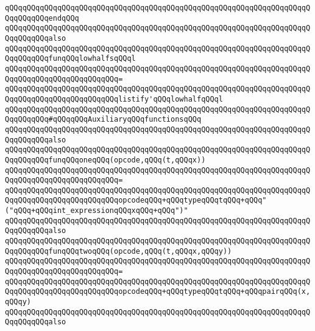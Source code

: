 \verb|qQQqqQQqqQQqqQQqqQQqqQQqqQQqqQQqqQQqqQQqqQQqqQQqqQQqqQQqqQQqqQQqqQQqqQQqqQQqqQQqendqQQq|\newline
\newline
\verb|qQQqqQQqqQQqqQQqqQQqqQQqqQQqqQQqqQQqqQQqqQQqqQQqqQQqqQQqqQQqqQQqqQQqqQQqqQQqqQQqalso|\newline
\verb|qQQqqQQqqQQqqQQqqQQqqQQqqQQqqQQqqQQqqQQqqQQqqQQqqQQqqQQqqQQqqQQqqQQqqQQqqQQqqQQqfunqQQqlowhalfsqQQql|\newline
\verb|qQQqqQQqqQQqqQQqqQQqqQQqqQQqqQQqqQQqqQQqqQQqqQQqqQQqqQQqqQQqqQQqqQQqqQQqqQQqqQQqqQQqqQQqqQQqqQQq=|\newline
\verb|qQQqqQQqqQQqqQQqqQQqqQQqqQQqqQQqqQQqqQQqqQQqqQQqqQQqqQQqqQQqqQQqqQQqqQQqqQQqqQQqqQQqqQQqqQQqqQQqlistify'qQQqlowhalfqQQql|\newline
\newline
\newline
\verb|qQQqqQQqqQQqqQQqqQQqqQQqqQQqqQQqqQQqqQQqqQQqqQQqqQQqqQQqqQQqqQQqqQQqqQQqqQQqqQQq#qQQqqQQqAuxiliaryqQQqfunctionsqQQq|\newline
\verb|qQQqqQQqqQQqqQQqqQQqqQQqqQQqqQQqqQQqqQQqqQQqqQQqqQQqqQQqqQQqqQQqqQQqqQQqqQQqqQQqalso|\newline
\verb|qQQqqQQqqQQqqQQqqQQqqQQqqQQqqQQqqQQqqQQqqQQqqQQqqQQqqQQqqQQqqQQqqQQqqQQqqQQqqQQqfunqQQqoneqQQq(opcode,qQQq(t,qQQqx))|\newline
\verb|qQQqqQQqqQQqqQQqqQQqqQQqqQQqqQQqqQQqqQQqqQQqqQQqqQQqqQQqqQQqqQQqqQQqqQQqqQQqqQQqqQQqqQQqqQQqqQQq=|\newline
\verb|qQQqqQQqqQQqqQQqqQQqqQQqqQQqqQQqqQQqqQQqqQQqqQQqqQQqqQQqqQQqqQQqqQQqqQQqqQQqqQQqqQQqqQQqqQQqqQQqopcodeqQQq+qQQqtypeqQQqtqQQq+qQQq"("qQQq+qQQqint_expressionqQQqxqQQq+qQQq")"|\newline
\newline
\verb|qQQqqQQqqQQqqQQqqQQqqQQqqQQqqQQqqQQqqQQqqQQqqQQqqQQqqQQqqQQqqQQqqQQqqQQqqQQqqQQqalso|\newline
\verb|qQQqqQQqqQQqqQQqqQQqqQQqqQQqqQQqqQQqqQQqqQQqqQQqqQQqqQQqqQQqqQQqqQQqqQQqqQQqqQQqfunqQQqtwoqQQq(opcode,qQQq(t,qQQqx,qQQqy))|\newline
\verb|qQQqqQQqqQQqqQQqqQQqqQQqqQQqqQQqqQQqqQQqqQQqqQQqqQQqqQQqqQQqqQQqqQQqqQQqqQQqqQQqqQQqqQQqqQQqqQQq=|\newline
\verb|qQQqqQQqqQQqqQQqqQQqqQQqqQQqqQQqqQQqqQQqqQQqqQQqqQQqqQQqqQQqqQQqqQQqqQQqqQQqqQQqqQQqqQQqqQQqqQQqopcodeqQQq+qQQqtypeqQQqtqQQq+qQQqpairqQQq(x,qQQqy)|\newline
\newline
\verb|qQQqqQQqqQQqqQQqqQQqqQQqqQQqqQQqqQQqqQQqqQQqqQQqqQQqqQQqqQQqqQQqqQQqqQQqqQQqqQQqalso|\newline
